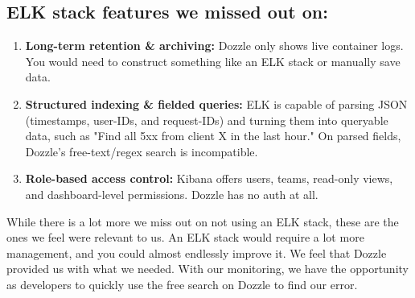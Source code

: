 \subsection*{ELK stack features we missed out on:}

\begin{enumerate}

  \item \textbf{Long-term retention \& archiving:} Dozzle only shows live container logs. You would need to construct something like an ELK stack or manually save data.
  \item \textbf{Structured indexing \& fielded queries:} ELK is capable of parsing JSON (timestamps, user-IDs, and request-IDs) and turning them into queryable data, such as "Find all 5xx from client X in the last hour." On parsed fields, Dozzle's free-text/regex search is incompatible.
  
  \item \textbf{Role-based access control:} Kibana offers users, teams, read-only views, and dashboard-level permissions. Dozzle has no auth at all.

\end{enumerate}

While there is a lot more we miss out on not using an ELK stack, these are the ones we feel were relevant to us. An ELK stack would require a lot more management, and you could almost endlessly improve it. We feel that Dozzle provided us with what we needed. With our monitoring, we have the opportunity as developers to quickly use the free search on Dozzle to find our error. 